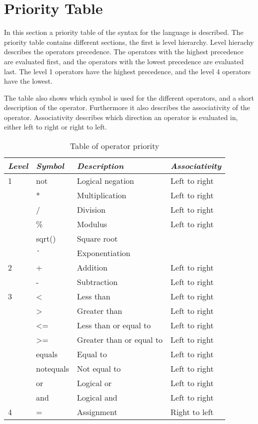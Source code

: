 \section{Priority Table}
In this section a priority table of the syntax for the language is described. The priority table contains different sections, the first is level hierarchy. Level hierachy describes the operators precedence. The operators with the highest precedence are evaluated first, and the operators with the lowest precedence are evaluated last. The level 1 operators have the highest precedence, and the level 4 operators have the lowest.
 
The table also shows which symbol is used for the different operators, and a short description of the operator. Furthermore it also describes the associativity of the operator. Associativity describes which direction an operator is evaluated in, either left to right or right to left.

\begin{table}[H]
	\center
	\begin{tabular}{|l|l|l|l|}
	\hline
	\emph{Level} & \emph{Symbol} & \emph{Description} & \emph{Associativity} \\ 
 		\hline
 		1 & not & Logical negation & Left to right \\
 		& * & Multiplication & Left to right\\
 		& / & Division & Left to right\\
 		& \% & Modulus & Left to right\\
 		& sqrt() & Square root & \\
 		& $\texttt{\^{}}$ & Exponentiation &\\
 		\hline
 		2 & + & Addition & Left to right \\
 		& - & Subtraction & Left to right\\
 		\hline
 		3 & <  & Less than & Left to right \\
 		& > & Greater than & Left to right \\
 		& <= & Less than or equal to & Left to right \\
 		& >= & Greater than or equal to & Left to right \\
 		& equals & Equal to & Left to right \\
 		& notequals & Not equal to & Left to right \\
 		& or & Logical or & Left to right \\
 		& and & Logical and & Left to right\\
 		\hline
 		4 & = & Assignment & Right to left \\
 		\hline
	\end{tabular}
	\label{tab:priority}
	\caption{Table of operator priority}
\end{table} 

